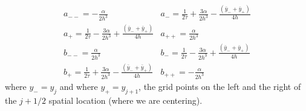 \documentclass{book}
\theoremstyle{plain}
\theoremstyle{definition}
\numberwithin{exm}{chapter}
\theoremstyle{remark}
\theoremstyle{summary}
\theoremstyle{overview}
\begin{document}
\begin{equation}\label{eq:1208}
\begin{array}{ll}
a_{--}=-\frac{\alpha}{2 h^{3}} & a_{-}=\frac{1}{2 \tau}+\frac{3 \alpha}{2 h^{3}}-\frac{\left(\bar{y}_{-}+\bar{y}_{+}\right)}{4 h} \\
a_{+}=\frac{1}{2 \tau}-\frac{3 \alpha}{2 h^{3}}+\frac{\left(\bar{y}_{-}+\bar{y}_{+}\right)}{4 h} & a_{++}=\frac{\alpha}{2 h^{3}} \\
b_{--}=\frac{\alpha}{2 h^{3}} & b_{-}=\frac{1}{2 \tau}-\frac{3 \alpha}{2 h^{3}}+\frac{\left(\bar{y}_{-}+\bar{y}_{+}\right)}{4 h} \\
b_{+}=\frac{1}{2 \tau}+\frac{3 \alpha}{2 h^{3}}-\frac{\left(\bar{y}_{-}+\bar{y}_{+}\right)}{4 h} & b_{++}=-\frac{\alpha}{2 h^{3}}
\end{array}
\end{equation}
where $y_{-}=y_{j}$ and where $y_{+}=y_{j+1}$, the grid points on the left and the right of the $j+1 / 2$ spatial location (where we are centering).
\end{document}
